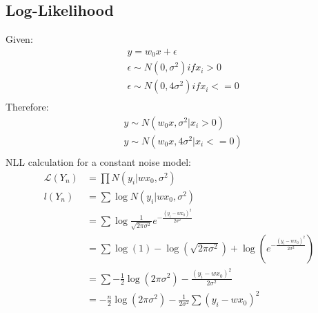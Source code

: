 \documentclass{article}
\begin{document}
\subsection{Log-Likelihood}
Given:
\begin{align*}
&y = w_0x+\epsilon \\
&\epsilon \sim N(0,\sigma^2) if x_i > 0\\
&\epsilon \sim N(0,4\sigma^2) if x_i <= 0\\
\end{align*}
Therefore:
\begin{align*}
&y \sim N(w_0x, \sigma^2 \vert x_i>0) \\
&y \sim N(w_0x, 4\sigma^2 \vert x_i<=0)\\
\end{align*}
NLL calculation for a constant noise model:
\begin{align*}
    \mathcal{L}(Y_n) &= \prod N(y_i \vert wx_0, \sigma^2) \\
    l(Y_n) &= \sum \log N(y_i \vert wx_0, \sigma^2) \\
    &= \sum \log \frac{1}{\sqrt{2\pi\sigma^2}}e^{-\frac{(y_i-wx_0)^2}{2\sigma^2}} \\
    &= \sum \log (1) - \log(\sqrt{2\pi\sigma^2})+ \log (e^{-\frac{(y_i-wx_0)^2}{2\sigma^2}}) \\
    &= \sum -\frac{1}{2}\log(2\pi\sigma^2) - \frac{(y_i-wx_0)^2}{2\sigma^2} \\
    &= -\frac{n}{2}\log(2\pi\sigma^2) - \frac{1}{2\sigma^2}\sum(y_i-wx_0)^2\\
\end{align*}
\end{document}

